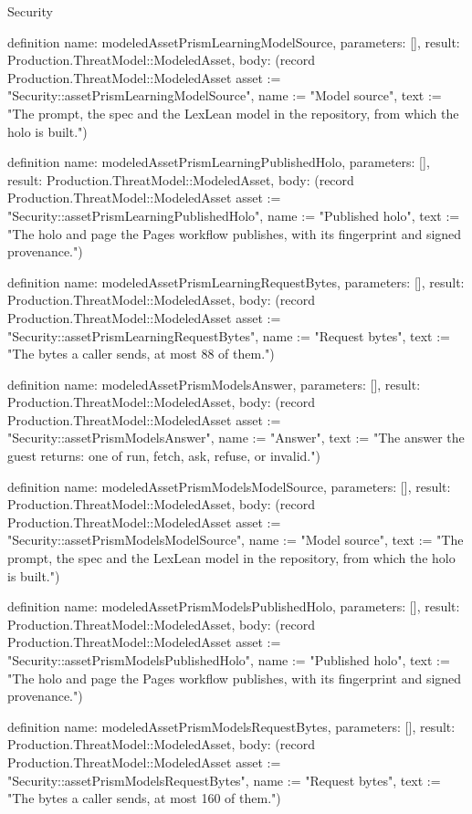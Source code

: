 \begin{lexlean}{Security}
\begin{semanticmodule}
definition{
  name: modeledAssetPrismLearningModelSource,
  parameters: [],
  result: Production.ThreatModel::ModeledAsset,
  body: (record Production.ThreatModel::ModeledAsset {asset := "Security::assetPrismLearningModelSource", name := "Model source", text := "The prompt, the spec and the LexLean model in the repository, from which the holo is built."})
}

definition{
  name: modeledAssetPrismLearningPublishedHolo,
  parameters: [],
  result: Production.ThreatModel::ModeledAsset,
  body: (record Production.ThreatModel::ModeledAsset {asset := "Security::assetPrismLearningPublishedHolo", name := "Published holo", text := "The holo and page the Pages workflow publishes, with its fingerprint and signed provenance."})
}

definition{
  name: modeledAssetPrismLearningRequestBytes,
  parameters: [],
  result: Production.ThreatModel::ModeledAsset,
  body: (record Production.ThreatModel::ModeledAsset {asset := "Security::assetPrismLearningRequestBytes", name := "Request bytes", text := "The bytes a caller sends, at most 88 of them."})
}

definition{
  name: modeledAssetPrismModelsAnswer,
  parameters: [],
  result: Production.ThreatModel::ModeledAsset,
  body: (record Production.ThreatModel::ModeledAsset {asset := "Security::assetPrismModelsAnswer", name := "Answer", text := "The answer the guest returns: one of run, fetch, ask, refuse, or invalid."})
}

definition{
  name: modeledAssetPrismModelsModelSource,
  parameters: [],
  result: Production.ThreatModel::ModeledAsset,
  body: (record Production.ThreatModel::ModeledAsset {asset := "Security::assetPrismModelsModelSource", name := "Model source", text := "The prompt, the spec and the LexLean model in the repository, from which the holo is built."})
}

definition{
  name: modeledAssetPrismModelsPublishedHolo,
  parameters: [],
  result: Production.ThreatModel::ModeledAsset,
  body: (record Production.ThreatModel::ModeledAsset {asset := "Security::assetPrismModelsPublishedHolo", name := "Published holo", text := "The holo and page the Pages workflow publishes, with its fingerprint and signed provenance."})
}

definition{
  name: modeledAssetPrismModelsRequestBytes,
  parameters: [],
  result: Production.ThreatModel::ModeledAsset,
  body: (record Production.ThreatModel::ModeledAsset {asset := "Security::assetPrismModelsRequestBytes", name := "Request bytes", text := "The bytes a caller sends, at most 160 of them."})
}


\end{semanticmodule}
\end{lexlean}
